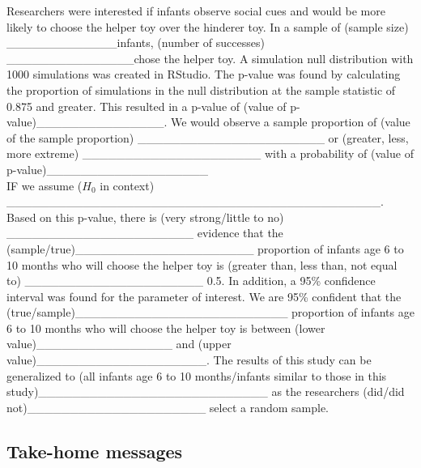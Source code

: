 \documentclass[
]{report}
\begin{document}
Researchers were interested if infants observe social cues and would be more likely to choose the helper toy over the hinderer toy. In a sample of (sample size) \_\_\_\_\_\_\_\_\_\_\_\_\_infants, (number of successes) \_\_\_\_\_\_\_\_\_\_\_\_\_\_\_chose the helper toy. A simulation null distribution with 1000 simulations was created in RStudio. The p-value was found by calculating the proportion of simulations in the null distribution at the sample statistic of 0.875 and greater. This resulted in a p-value of (value of p-value)\_\_\_\_\_\_\_\_\_\_\_\_\_\_\_. We would observe a sample proportion of (value of the sample proportion) \_\_\_\_\_\_\_\_\_\_\_\_\_\_\_\_\_\_\_\_\_\_ or (greater, less, more extreme) \_\_\_\_\_\_\_\_\_\_\_\_\_\_\_\_\_\_\_\_\_ with a probability of (value of p-value)\_\_\_\_\_\_\_\_\_\_\_\_\_\_\_\_\_\_\_\\
IF we assume (\(H_0\) in context) \_\_\_\_\_\_\_\_\_\_\_\_\_\_\_\_\_\_\_\_\_\_\_\_\_\_\_\_\_\_\_\_\_\_\_\_\_\_\_\_\_\_\_\_.
Based on this p-value, there is (very strong/little to no) \_\_\_\_\_\_\_\_\_\_\_\_\_\_\_\_\_\_\_\_\_\_ evidence that the (sample/true)\_\_\_\_\_\_\_\_\_\_\_\_\_\_\_\_\_\_\_\_\_ proportion of infants age 6 to 10 months who will choose the helper toy is (greater than, less than, not equal to) \_\_\_\_\_\_\_\_\_\_\_\_\_\_\_\_\_\_\_\_\_ 0.5. In addition, a 95\% confidence interval was found for the parameter of interest. We are 95\% confident that the (true/sample)\_\_\_\_\_\_\_\_\_\_\_\_\_\_\_\_\_\_\_\_\_\_\_\_\_ proportion of infants age 6 to 10 months who will choose the helper toy is between (lower value)\_\_\_\_\_\_\_\_\_\_\_\_\_\_\_\_ and (upper value)\_\_\_\_\_\_\_\_\_\_\_\_\_\_\_\_\_\_\_\_. The results of this study can be generalized to (all infants age 6 to 10 months/infants similar to those in this study)\_\_\_\_\_\_\_\_\_\_\_\_\_\_\_\_\_\_\_\_\_\_\_\_\_\_\_ as the researchers (did/did not)\_\_\_\_\_\_\_\_\_\_\_\_\_\_\_\_\_\_\_\_\_ select a random sample.


\subsection{Take-home messages}\label{take-home-messages-7}
\end{document}
